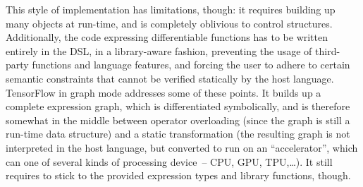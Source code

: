 This style of implementation has limitations, though: it requires building up many objects at
run-time, and is completely oblivious to control structures.  Additionally, the code expressing
differentiable functions has to be written entirely in the DSL, in a library-aware fashion,
preventing the usage of third-party functions and language features, and forcing the user to adhere
to certain semantic constraints that cannot be verified statically by the host language.  TensorFlow
in graph mode addresses some of these points.  It builds up a complete expression graph, which is
differentiated symbolically, and is therefore somewhat in the middle between operator overloading
(since the graph is still a run-time data structure) and a static transformation (the resulting
graph is not interpreted in the host language, but converted to run on an \enquote{accelerator},
which can one of several kinds of processing device~-- CPU, GPU, TPU,\ldots).  It still requires to
stick to the provided expression types and library functions, though.

